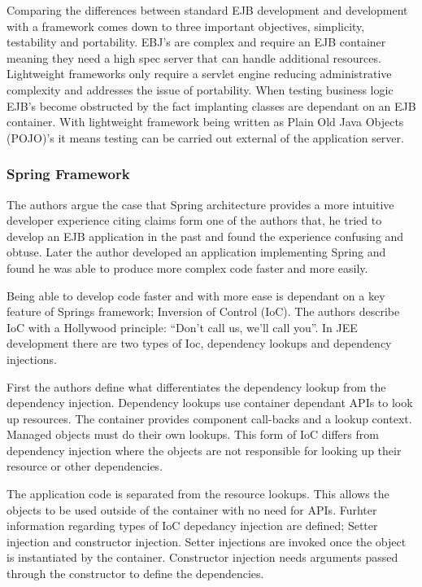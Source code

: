 \documentclass{article}
\begin{document}
		Comparing the differences between standard EJB development and development with a framework comes down to three important objectives, simplicity, testability and portability. EBJ’s are complex and require an EJB container meaning they need a high spec server that can handle additional resources. Lightweight frameworks only require a servlet engine reducing administrative complexity and addresses the issue of portability. When testing business logic EJB’s become obstructed by the fact implanting classes are dependant on an EJB container. With lightweight framework being written as Plain Old Java Objects (POJO)’s it means testing can be carried out external of the application server.
		
		\subsubsection{Spring Framework}
		The authors argue the case that Spring architecture provides a more intuitive developer experience citing claims form one of the authors that, he tried to develop an EJB application in the past and found the experience confusing and obtuse. Later the author developed an application implementing Spring and found he was able to produce more complex code faster and more easily.
		
		Being able to develop code faster and with more ease is dependant on a key feature of Springs framework; Inversion of Control (IoC). The authors describe IoC with a Hollywood principle: “Don’t call us, we’ll call you”. In JEE development there are two types of Ioc, dependency lookups and dependency injections.
		
		First the authors define what differentiates the dependency lookup from the dependency injection. Dependency lookups use container dependant APIs to look up resources. The container provides component call-backs and a lookup context. Managed objects must do their own lookups. This form of IoC differs from dependency injection where the objects are not responsible for looking up their resource or other dependencies.
			
		The application code is separated from the resource lookups. This allows the objects to be used outside of the container with no need for APIs. Furhter information regarding types of IoC depedancy injection are defined; Setter injection and constructor injection. Setter injections are invoked once the object is instantiated by the container. Constructor injection needs arguments passed through the constructor to define the dependencies.
		
\end{document}
